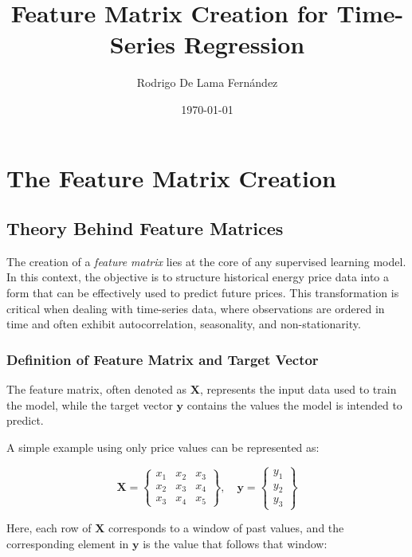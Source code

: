 \documentclass[a4paper,11pt]{article}
\title{Feature Matrix Creation for Time-Series Regression}
\author{Rodrigo De Lama Fernández}
\date{\today}
\begin{document}
\maketitle

\section{The Feature Matrix Creation}

\subsection{Theory Behind Feature Matrices}

The creation of a \textit{feature matrix} lies at the core of any supervised learning model. In this context, the objective is to structure historical energy price data into a form that can be effectively used to predict future prices. This transformation is critical when dealing with time-series data, where observations are ordered in time and often exhibit autocorrelation, seasonality, and non-stationarity.

\subsubsection{Definition of Feature Matrix and Target Vector}

    The feature matrix, often denoted as $\mathbf{X}$, represents the input data used to     train the model, while the target vector $\mathbf{y}$ contains the values the model is intended to predict.

    A simple example using only price values can be represented as:

    \begin{equation*}
    \mathbf{X} = \begin{Bmatrix}
    x_1 & x_2 & x_3 \\
    x_2 & x_3 & x_4 \\
    x_3 & x_4 & x_5
    \end{Bmatrix}, \quad
    \mathbf{y} = \begin{Bmatrix}
    y_1 \\
    y_2 \\
    y_3
    \end{Bmatrix}
    \end{equation*}

Here, each row of $\mathbf{X}$ corresponds to a window of past values, and the corresponding element in $\mathbf{y}$ is the value that follows that window:
\end{document}
